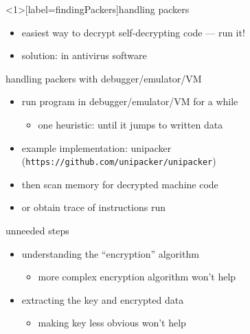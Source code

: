 
\begin{frame}<1>[label=findingPackers]{handling packers}
    \begin{itemize}
    \item easiest way to decrypt self-decrypting code --- run it!
    \item solution:  in antivirus software
    \end{itemize}
\end{frame}

\begin{frame}{handling packers with debugger/emulator/VM}
    \begin{itemize}
    \item run program in debugger/emulator/VM for a while
        \begin{itemize}
        \item one heuristic: until it jumps to written data
        \end{itemize}
    \item example implementation: unipacker (\texttt{https://github.com/unipacker/unipacker})
    \vspace{.5cm}
    \item then scan memory for decrypted machine code
    \item or obtain trace of instructions run
    \vspace{.5cm}
    \end{itemize}
\end{frame}

\begin{frame}{unneeded steps}
    \begin{itemize}
    \item understanding the ``encryption'' algorithm
        \begin{itemize}
        \item more complex encryption algorithm won't help
        \end{itemize}
    \item extracting the key and encrypted data
        \begin{itemize}
        \item making key less obvious won't help
        \end{itemize}
    \end{itemize}
\end{frame}


